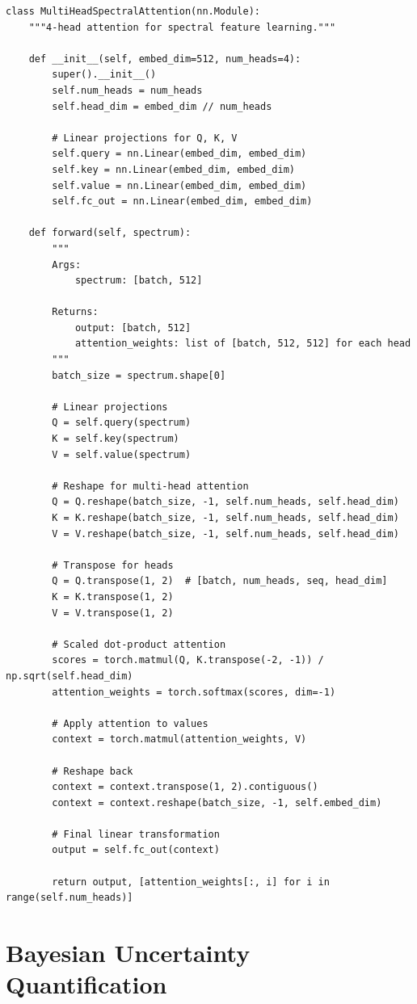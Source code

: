 \documentclass[12pt,a4paper,oneside]{report}
\begin{document}
\begin{lstlisting}
class MultiHeadSpectralAttention(nn.Module):
    """4-head attention for spectral feature learning."""

    def __init__(self, embed_dim=512, num_heads=4):
        super().__init__()
        self.num_heads = num_heads
        self.head_dim = embed_dim // num_heads

        # Linear projections for Q, K, V
        self.query = nn.Linear(embed_dim, embed_dim)
        self.key = nn.Linear(embed_dim, embed_dim)
        self.value = nn.Linear(embed_dim, embed_dim)
        self.fc_out = nn.Linear(embed_dim, embed_dim)

    def forward(self, spectrum):
        """
        Args:
            spectrum: [batch, 512]

        Returns:
            output: [batch, 512]
            attention_weights: list of [batch, 512, 512] for each head
        """
        batch_size = spectrum.shape[0]

        # Linear projections
        Q = self.query(spectrum)
        K = self.key(spectrum)
        V = self.value(spectrum)

        # Reshape for multi-head attention
        Q = Q.reshape(batch_size, -1, self.num_heads, self.head_dim)
        K = K.reshape(batch_size, -1, self.num_heads, self.head_dim)
        V = V.reshape(batch_size, -1, self.num_heads, self.head_dim)

        # Transpose for heads
        Q = Q.transpose(1, 2)  # [batch, num_heads, seq, head_dim]
        K = K.transpose(1, 2)
        V = V.transpose(1, 2)

        # Scaled dot-product attention
        scores = torch.matmul(Q, K.transpose(-2, -1)) / np.sqrt(self.head_dim)
        attention_weights = torch.softmax(scores, dim=-1)

        # Apply attention to values
        context = torch.matmul(attention_weights, V)

        # Reshape back
        context = context.transpose(1, 2).contiguous()
        context = context.reshape(batch_size, -1, self.embed_dim)

        # Final linear transformation
        output = self.fc_out(context)

        return output, [attention_weights[:, i] for i in range(self.num_heads)]
\end{lstlisting}

\section{Bayesian Uncertainty Quantification}
\end{document}
